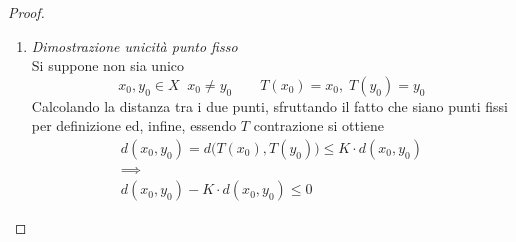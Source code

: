 \begin{theorem}
\begin{proof}
\begin{enumerate}
				La successione $x$ definita in \cref{eq:teo_contraz_succ} ammette sicuramente $\lim x \in X$ per , essendo stata dimostrata di Cauchy nel passo precedente. Inoltre
				\[
					T \text{ Contrazione}
					\quad \overset{
						\mathclap{
							\rule[-\baselineskip]{0pt}{\baselineskip}
							\text{
								\begin{tabular}{c}
									Come da\\[-1ex]
									\fullref{def:contrazione}
								\end{tabular}
							}
						}
					}{\implies} \quad T \text{ Lipschitziana}
					\quad \overset{
						\mathclap{
							\rule[-\baselineskip]{0pt}{\baselineskip}
							\text{
								\begin{tabular}{c}
									Per\\[-1ex]
									\fullref{prop:se_lips_allora_unif_cont}
								\end{tabular}
							}
						}
					}{\implies} \quad T \text{ Unif. Cont.}
					\quad \overset{
						\mathclap{
							\rule[-\baselineskip]{0pt}{\baselineskip}
							\text{
								\begin{tabular}{c}
									Per\\[-1ex]
									\fullref{prop:if_unif_cont_then_conf}
								\end{tabular}
							}
						}
					}{\implies} \quad T \text{ Continua}
				\]
				Posto quindi
				\begin{align*}
					T(x_*) &= T \bigl( \; \lim\limits_{n \to +\infty} x_n \; \bigr)
					\shortintertext{Grazie alla continuità di $T$}
					&= \lim\limits_{n \to +\infty} \bigl(T(x_n)\bigr)
					\shortintertext{Dunque, per come è definita $x$}
					&= \lim\limits_{n \to +\infty} ( x_{n+1} )
					\shortintertext{Dunque, essendo $x$ di Cacuhy}
					&= x_*
				\end{align*}
				\qed
			\item \textit{Dimostrazione unicità punto fisso}\\
				Si suppone non sia unico
				\[x_0, y_0 \in X \;\; x_0 \neq y_0 \qquad T(x_0) = x_0,\; T(y_0) = y_0\]
				Calcolando la distanza tra i due punti, sfruttando il fatto che siano punti fissi per definizione ed, infine, essendo $T$ contrazione si ottiene
				\begin{equation*}
					\begin{gathered}
						d(x_0, y_0) = d\bigl( T(x_0), T(y_0) \bigr) \leq K \cdot d(x_0, y_0)\\
						\implies\\
						d(x_0, y_0) - K \cdot d(x_0, y_0) \leq 0

\end{gathered}
\end{equation*}
\end{enumerate}
\end{proof}
\end{theorem}
